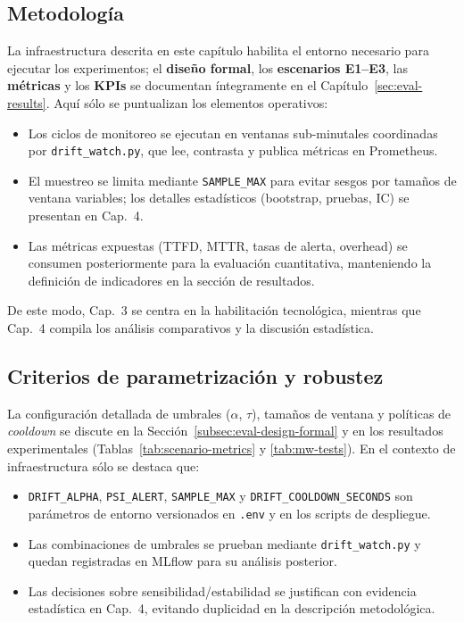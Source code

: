 \subsection{Metodología}

La infraestructura descrita en este capítulo habilita el entorno necesario para ejecutar los experimentos; el \textbf{diseño formal}, los \textbf{escenarios E1--E3}, las \textbf{métricas} y los \textbf{KPIs} se documentan íntegramente en el Capítulo~\ref{sec:eval-results}.  
Aquí sólo se puntualizan los elementos operativos:
\begin{itemize}\setlength\itemsep{2pt}
  \item Los ciclos de monitoreo se ejecutan en ventanas sub-minutales coordinadas por \texttt{drift\_watch.py}, que lee, contrasta y publica métricas en Prometheus.
  \item El muestreo se limita mediante \texttt{SAMPLE\_MAX} para evitar sesgos por tamaños de ventana variables; los detalles estadísticos (bootstrap, pruebas, IC) se presentan en Cap.~4.
  \item Las métricas expuestas (TTFD, MTTR, tasas de alerta, overhead) se consumen posteriormente para la evaluación cuantitativa, manteniendo la definición de indicadores en la sección de resultados.
\end{itemize}
De este modo, Cap.~3 se centra en la habilitación tecnológica, mientras que Cap.~4 compila los análisis comparativos y la discusión estadística.

\subsection{Criterios de parametrización y robustez}

La configuración detallada de umbrales ($\alpha$, $\tau$), tamaños de ventana y políticas de \textit{cooldown} se discute en la Sección~\ref{subsec:eval-design-formal} y en los resultados experimentales (Tablas~\ref{tab:scenario-metrics} y \ref{tab:mw-tests}).  
En el contexto de infraestructura sólo se destaca que:
\begin{itemize}\setlength\itemsep{2pt}
  \item \texttt{DRIFT\_ALPHA}, \texttt{PSI\_ALERT}, \texttt{SAMPLE\_MAX} y \texttt{DRIFT\_COOLDOWN\_SECONDS} son parámetros de entorno versionados en \texttt{.env} y en los scripts de despliegue.
  \item Las combinaciones de umbrales se prueban mediante \texttt{drift\_watch.py} y quedan registradas en MLflow para su análisis posterior.
  \item Las decisiones sobre sensibilidad/estabilidad se justifican con evidencia estadística en Cap.~4, evitando duplicidad en la descripción metodológica.
\end{itemize}


